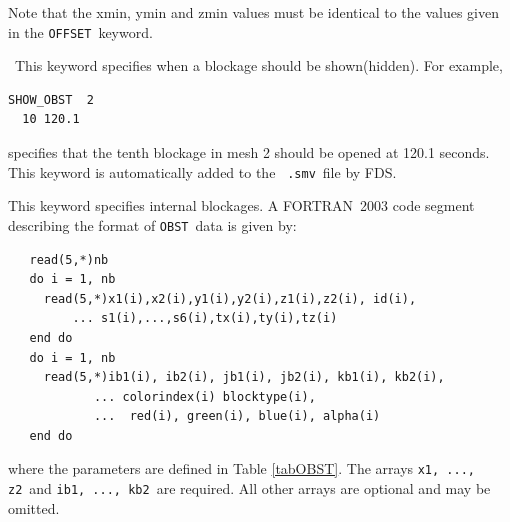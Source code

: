 \documentclass[11pt,twoside]{book}
\newcommand{\hitem}[1]{\item[{\bf #1} \hfill]}
\begin{document}
Note that the xmin, ymin and zmin values must be identical to the values given in the
{\tt OFFSET}\ keyword.


\hitem{SHOW\_OBST(HIDE\_OBST)}\ This keyword specifies when a
blockage should be shown(hidden). For example,
\begin{lstlisting}
SHOW_OBST  2
  10 120.1
\end{lstlisting}
specifies that the tenth blockage in mesh 2 should be opened at
120.1 seconds.  This keyword is automatically added to the {\tt
.smv}\ file by FDS.

\hitem{OBST}This keyword specifies internal blockages. A
FORTRAN~2003 code segment describing the format of {\tt OBST}\ data
is given by:
\begin{lstlisting}
   read(5,*)nb
   do i = 1, nb
     read(5,*)x1(i),x2(i),y1(i),y2(i),z1(i),z2(i), id(i),
         ... s1(i),...,s6(i),tx(i),ty(i),tz(i)
   end do
   do i = 1, nb
     read(5,*)ib1(i), ib2(i), jb1(i), jb2(i), kb1(i), kb2(i),
            ... colorindex(i) blocktype(i),
            ...  red(i), green(i), blue(i), alpha(i)
   end do
\end{lstlisting}
where the parameters are defined in Table \ref{tabOBST}.
The arrays {\tt x1, ..., z2}\ and {\tt ib1, ..., kb2}\ are
required. All other arrays are optional and may be omitted.
\end{document}
